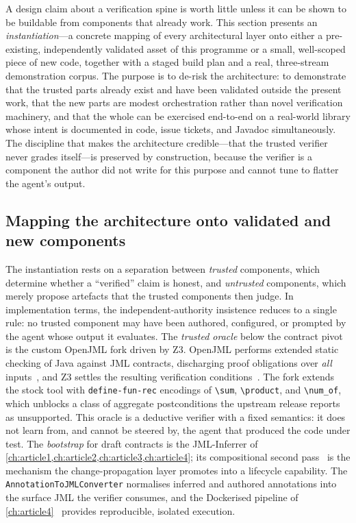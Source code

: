 A design claim about a verification spine is worth little unless it can be shown to be buildable from components that already work. This section presents an \emph{instantiation}---a concrete mapping of every architectural layer onto either a pre-existing, independently validated asset of this programme or a small, well-scoped piece of new code, together with a staged build plan and a real, three-stream demonstration corpus. The purpose is to de-risk the architecture: to demonstrate that the trusted parts already exist and have been validated outside the present work, that the new parts are modest orchestration rather than novel verification machinery, and that the whole can be exercised end-to-end on a real-world library whose intent is documented in code, issue tickets, and Javadoc simultaneously. The discipline that makes the architecture credible---that the trusted verifier never grades itself---is preserved by construction, because the verifier is a component the author did not write for this purpose and cannot tune to flatter the agent's output.

\subsection{Mapping the architecture onto validated and new components}\label{subsec:a5-mapping}

The instantiation rests on a separation between \emph{trusted} components, which determine whether a ``verified'' claim is honest, and \emph{untrusted} components, which merely propose artefacts that the trusted components then judge. In implementation terms, the independent-authority insistence reduces to a single rule: no trusted component may have been authored, configured, or prompted by the agent whose output it evaluates. The \emph{trusted oracle} below the contract pivot is the custom OpenJML fork driven by Z3. OpenJML performs extended static checking of Java against JML contracts, discharging proof obligations over \emph{all} inputs~\cite{cok2014openjml,cok2011openjml}, and Z3 settles the resulting verification conditions~\cite{demoura2008z3}. The fork extends the stock tool with \texttt{define-fun-rec} encodings of \verb|\sum|, \verb|\product|, and \verb|\num_of|, which unblocks a class of aggregate postconditions the upstream release reports as unsupported. This oracle is a deductive verifier with a fixed semantics: it does not learn from, and cannot be steered by, the agent that produced the code under test. The \emph{bootstrap} for draft contracts is the JML-Inferrer of \cref{ch:article1,ch:article2,ch:article3,ch:article4}; its compositional second pass~\cite{edmonds_article3} is the mechanism the change-propagation layer promotes into a lifecycle capability. The \texttt{AnnotationToJMLConverter} normalises inferred and authored annotations into the surface JML the verifier consumes, and the Dockerised pipeline of \cref{ch:article4}~\cite{edmonds_article4} provides reproducible, isolated execution.

